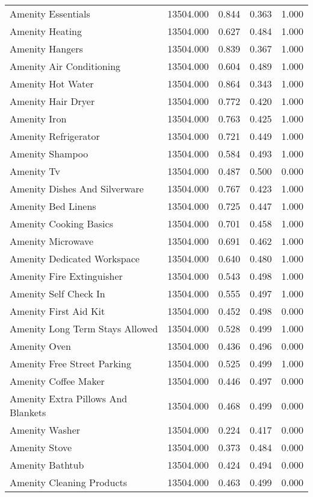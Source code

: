 \begin{tabular}{lllll}
Amenity Essentials & 13504.000 & 0.844 & 0.363 & 1.000 \\
Amenity Heating & 13504.000 & 0.627 & 0.484 & 1.000 \\
Amenity Hangers & 13504.000 & 0.839 & 0.367 & 1.000 \\
Amenity Air Conditioning & 13504.000 & 0.604 & 0.489 & 1.000 \\
Amenity Hot Water & 13504.000 & 0.864 & 0.343 & 1.000 \\
Amenity Hair Dryer & 13504.000 & 0.772 & 0.420 & 1.000 \\
Amenity Iron & 13504.000 & 0.763 & 0.425 & 1.000 \\
Amenity Refrigerator & 13504.000 & 0.721 & 0.449 & 1.000 \\
Amenity Shampoo & 13504.000 & 0.584 & 0.493 & 1.000 \\
Amenity Tv & 13504.000 & 0.487 & 0.500 & 0.000 \\
Amenity Dishes And Silverware & 13504.000 & 0.767 & 0.423 & 1.000 \\
Amenity Bed Linens & 13504.000 & 0.725 & 0.447 & 1.000 \\
Amenity Cooking Basics & 13504.000 & 0.701 & 0.458 & 1.000 \\
Amenity Microwave & 13504.000 & 0.691 & 0.462 & 1.000 \\
Amenity Dedicated Workspace & 13504.000 & 0.640 & 0.480 & 1.000 \\
Amenity Fire Extinguisher & 13504.000 & 0.543 & 0.498 & 1.000 \\
Amenity Self Check In & 13504.000 & 0.555 & 0.497 & 1.000 \\
Amenity First Aid Kit & 13504.000 & 0.452 & 0.498 & 0.000 \\
Amenity Long Term Stays Allowed & 13504.000 & 0.528 & 0.499 & 1.000 \\
Amenity Oven & 13504.000 & 0.436 & 0.496 & 0.000 \\
Amenity Free Street Parking & 13504.000 & 0.525 & 0.499 & 1.000 \\
Amenity Coffee Maker & 13504.000 & 0.446 & 0.497 & 0.000 \\
Amenity Extra Pillows And Blankets & 13504.000 & 0.468 & 0.499 & 0.000 \\
Amenity Washer & 13504.000 & 0.224 & 0.417 & 0.000 \\
Amenity Stove & 13504.000 & 0.373 & 0.484 & 0.000 \\
Amenity Bathtub & 13504.000 & 0.424 & 0.494 & 0.000 \\
Amenity Cleaning Products & 13504.000 & 0.463 & 0.499 & 0.000 \\

\end{tabular}
